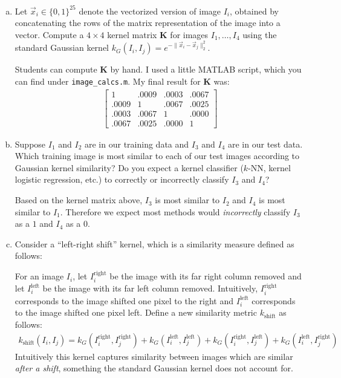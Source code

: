 \documentclass[10pt]{article}
\newcommand{\bv}[1]{\mathbf{#1}}
\begin{document}
\begin{enumerate}[(a)]
	\item Let $\vec{x}_i \in \{0,1\}^{25}$ denote the vectorized version of image $I_i$, obtained by concatenating the rows of the matrix representation of the image into a vector. Compute a $4\times 4$ kernel matrix $\bv{K}$ for images $I_1, \ldots, I_4$ using the standard Gaussian kernel $k_G(I_i, I_j) = e^{-\|\vec{x}_i - \vec{x}_j\|_2^2}$. 
	
	\color{blue}
	Students can compute $\bv{K}$ by hand. I used a little MATLAB script, which you can find under \texttt{image\_calcs.m}. My final result for $\bv{K}$ was:
	\begin{align*}
	\begin{bmatrix}
	1 & .0009 & .0003 & .0067 \\
	.0009 & 1 & .0067 & .0025 \\
	.0003 & .0067 & 1 & .0000  \\
	.0067 & .0025 & .0000 & 1
	\end{bmatrix}
	\end{align*}
	\color{black}

	
	
	\item Suppose $I_1$ and $I_2$ are in our training data and $I_3$ and $I_4$ are in our test data. Which training image is most similar to each of our test images according to Gaussian kernel similarity? Do you expect a kernel classifier ($k$-NN, kernel logistic regression, etc.) to correctly or incorrectly classify $I_3$ and $I_4$?
	
	\color{blue}
	Based on the kernel matrix above, $I_3$ is most similar to $I_2$ and $I_4$ is most similar to $I_1$. Therefore we expect most methods would \emph{incorrectly} classify $I_3$ as a $1$ and $I_4$ as a $0$. 
	\color{black}
	
	\item Consider a ``left-right shift'' kernel, which is a similarity measure defined as follows:
	
	For an image $I_i$, let $I_i^{\text{right}}$ be the image with its far right column removed and let $I_i^{\text{left}}$ be the image with its far left column removed. Intuitively, $I_i^{\text{right}}$ corresponds to the image shifted one pixel to the right and $I_i^{\text{left}}$ corresponds to the image shifted one pixel left. Define a new similarity metric $k_{\text{shift}}$ as follows: 
	\begin{align*}
	k_{\text{shift}}(I_i, I_j) = k_G(I_i^\text{right}, I_j^\text{right}) + k_G(I_i^\text{left}, I_j^\text{left}) + k_G(I_i^{\text{right}}, I_j^{\text{left}}) + k_G(I_i^{\text{left}}, I_j^{\text{right}}) 
	\end{align*}
	Intuitively this kernel captures similarity between images which are similar \emph{after a shift}, something the standard Gaussian kernel does not account for. 
	

\end{enumerate}
\end{document}
